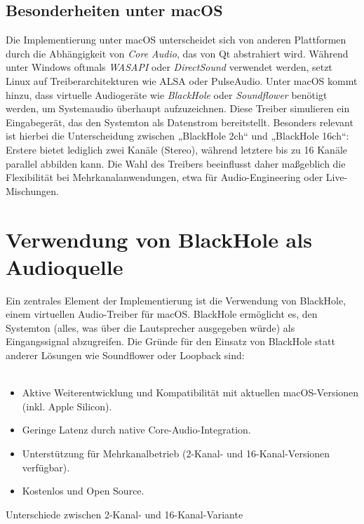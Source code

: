 \subsection{Besonderheiten unter macOS}
Die Implementierung unter macOS unterscheidet sich von anderen Plattformen durch die Abhängigkeit von \textit{Core Audio}, das von Qt abstrahiert wird. Während unter Windows oftmals \textit{WASAPI} oder \textit{DirectSound} verwendet werden, setzt Linux auf Treiberarchitekturen wie ALSA oder PulseAudio.  
Unter macOS kommt hinzu, dass virtuelle Audiogeräte wie \textit{BlackHole} oder \textit{Soundflower} benötigt werden, um Systemaudio überhaupt aufzuzeichnen. Diese Treiber simulieren ein Eingabegerät, das den Systemton als Datenstrom bereitstellt.  
Besonders relevant ist hierbei die Unterscheidung zwischen „BlackHole 2ch“ und „BlackHole 16ch“: Erstere bietet lediglich zwei Kanäle (Stereo), während letztere bis zu 16 Kanäle parallel abbilden kann. Die Wahl des Treibers beeinflusst daher maßgeblich die Flexibilität bei Mehrkanalanwendungen, etwa für Audio-Engineering oder Live-Mischungen.


\section{Verwendung von BlackHole als Audioquelle}

Ein zentrales Element der Implementierung ist die Verwendung von BlackHole, einem virtuellen Audio-Treiber für macOS.
BlackHole ermöglicht es, den Systemton (alles, was über die Lautsprecher ausgegeben würde) als Eingangssignal abzugreifen.
Die Gründe für den Einsatz von BlackHole statt anderer Lösungen wie Soundflower oder Loopback sind: \\\\

\begin{itemize}
 \item Aktive Weiterentwicklung und Kompatibilität mit aktuellen macOS-Versionen (inkl. Apple Silicon).
\item Geringe Latenz durch native Core-Audio-Integration.
\item Unterstützung für Mehrkanalbetrieb (2-Kanal- und 16-Kanal-Versionen verfügbar).
\item Kostenlos und Open Source.  
\cite{blackhole}
\end{itemize}

\label{sec:chapter03:listen}
Unterschiede zwischen 2-Kanal- und 16-Kanal-Variante

